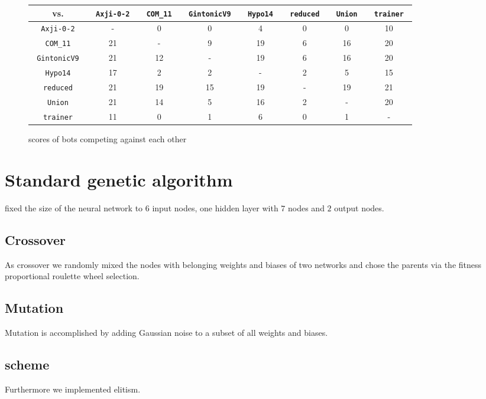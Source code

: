 \documentclass[11pt,a4paper]{scrartcl}
\begin{document}
\begin{figure}
\begin{tabular}{c|ccccccc}
vs. & 
\texttt{ Axji-0-2 } &
\texttt{ COM\_11 } &
\texttt{ GintonicV9 } &
\texttt{ Hypo14 } &
\texttt{ reduced } &
\texttt{ Union } &
\texttt{ trainer } \\
\hline
\texttt{ Axji-0-2 } & - & 0 & 0 & 4 & 0 & 0 & 10 \\
\texttt{ COM\_11 } & 21 & - & 9 & 19 & 6 & 16 & 20 \\
\texttt{ GintonicV9 } & 21 & 12 & - & 19 & 6 & 16 & 20 \\
\texttt{ Hypo14 } & 17 & 2 & 2 & - & 2 & 5 & 15 \\
\texttt{ reduced } & 21 & 19 & 15 & 19 & - & 19 & 21 \\
\texttt{ Union } & 21 & 14 & 5 & 16 & 2 & - & 20 \\
\texttt{ trainer } & 11 & 0 & 1 & 6 & 0 & 1 & -
\end{tabular}
\caption{scores of bots competing against each other}
\end{figure}



\section{Standard genetic algorithm}

fixed the size of the neural network to $6$ input nodes, one hidden layer with $7$ nodes and $2$ output nodes.


\subsection{Crossover}

As crossover we randomly mixed the nodes with belonging weights and biases of two networks and chose the parents via the fitness proportional roulette wheel selection.


\subsection{Mutation}

Mutation is accomplished by adding Gaussian noise to a subset of all weights and biases.


\subsection{scheme}

Furthermore we implemented elitism.
\end{document}
